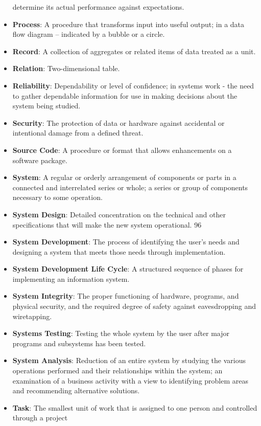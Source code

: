 \begin{itemize}
	determine its actual performance against expectations.
	\item \textbf{Process}:  A procedure that transforms input into useful output; in a data flow diagram – indicated by
	a bubble or a circle.
	\item \textbf{Record}:  A collection of aggregates or related items of data treated as a unit.
	\item \textbf{Relation}:  Two-dimensional table.
	\item \textbf{Reliability}:  Dependability or level of confidence; in systems work - the need to gather dependable
	information for use in making decisions about the system being studied.
	\item \textbf{Security}:  The protection of data or hardware against accidental or intentional damage from a
	defined threat.
	\item \textbf{Source Code}:  A procedure or format that allows enhancements on a software package.
	\item \textbf{System}:  A regular or orderly arrangement of components or parts in a connected and interrelated
	series or whole; a series or group of components necessary to some operation.
	\item \textbf{System Design}:  Detailed concentration on the technical and other specifications that will make the
	new system operational. 
	96
	\item \textbf{System Development}:  The process of identifying the user’s needs and designing a system that
	meets those needs through implementation.
	\item \textbf{System Development Life Cycle}:  A structured sequence of phases for implementing an information
	system.
	\item \textbf{System Integrity}:  The proper functioning of hardware, programs, and physical security, and the
	required degree of safety against eavesdropping and wiretapping.
	\item \textbf{Systems Testing}:  Testing the whole system by the user after major programs and subsystems has
	been tested.
	\item \textbf{System Analysis}:  Reduction of an entire system by studying the various operations performed and
	their relationships within the system; an examination of a business activity with a view to
	identifying problem areas and recommending alternative solutions.
	\item \textbf{Task}:  The smallest unit of work that is assigned to one person and controlled through a project

\end{itemize}
